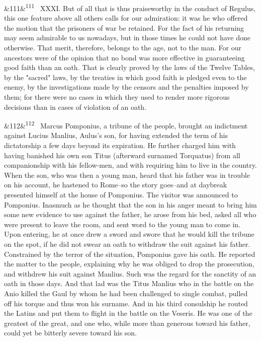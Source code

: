 \documentclass[12pt]{article}
\newcommand{\para}[1][]{\par\noindent\ifx&#1&\else\textsuperscript{\footnotesize #1}~\fi}
\begin{document}
\para[111] XXXI. But of all that is thus praiseworthy in the conduct of Regulus, this one feature above all others calls for our admiration: it was he who offered the motion that the prisoners of war be retained. For the fact of his returning may seem admirable to us nowadays, but in those times he could not have done otherwise. That merit, therefore, belongs to the age, not to the man. For our ancestors were of the opinion that no bond was more effective in guaranteeing good faith than an oath. That is clearly proved by the laws of the Twelve Tables, by the "sacred" laws, by the treaties in which good faith is pledged even to the enemy, by the investigations made by the censors and the penalties imposed by them; for there were no cases in which they used to render more rigorous decisions than in cases of violation of an oath.

\para[112] Marcus Pomponius, a tribune of the people, brought an indictment against Lucius Manlius, Aulus's son, for having extended the term of his dictatorship a few days beyond its expiration. He further charged him with having banished his own son Titus (afterward surnamed Torquatus) from all companionship with his fellow-men, and with requiring him to live in the country. When the son, who was then a young man, heard that his father was in trouble on his account, he hastened to Rome--so the story goes--and at daybreak presented himself at the house of Pomponius. The visitor was announced to Pomponius. Inasmuch as he thought that the son in his anger meant to bring him some new evidence to use against the father, he arose from his bed, asked all who were present to leave the room, and sent word to the young man to come in. Upon entering, he at once drew a sword and swore that he would kill the tribune on the spot, if he did not swear an oath to withdraw the suit against his father. Constrained by the terror of the situation, Pomponius gave his oath. He reported the matter to the people, explaining why he was obliged to drop the prosecution, and withdrew his suit against Manlius. Such was the regard for the sanctity of an oath in those days. And that lad was the Titus Manlius who in the battle on the Anio killed the Gaul by whom he had been challenged to single combat, pulled off his torque and thus won his surname. And in his third consulship he routed the Latins and put them to flight in the battle on the Veseris. He was one of the greatest of the great, and one who, while more than generous toward his father, could yet be bitterly severe toward his son.
\end{document}
